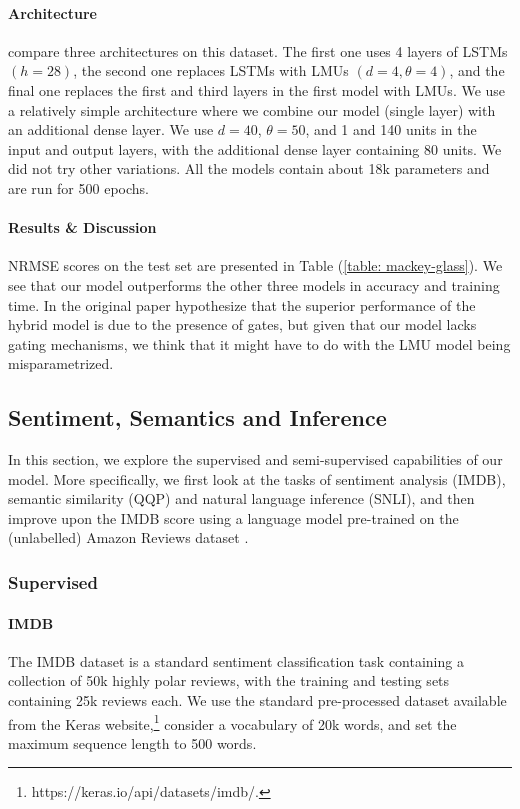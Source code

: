 \documentclass{article}
\begin{document}
\paragraph{Architecture} \citet{voelker2018improving} compare three architectures on this dataset. The first one uses 4 layers of LSTMs $(h=28)$, the second one replaces LSTMs with LMUs $(d=4, \theta=4)$, and the final one replaces the first and third layers in the first model with LMUs. We use a relatively simple architecture where we combine our model (single layer) with an additional dense layer. We use $d=40$, $\theta=50$, and 1 and 140 units in the input and output layers, with the additional dense layer containing 80 units. We did not try other variations. All the models contain about 18k parameters and are run for 500 epochs.

\paragraph{Results \& Discussion} NRMSE scores on the test set are presented in Table (\ref{table: mackey-glass}). We see that our model outperforms the other three models in accuracy and training time. In the original paper \citet{voelker2018improving} hypothesize that the superior performance of the hybrid model is due to the presence of gates, but given that our model lacks gating mechanisms, we think that it might have to do with the LMU model being misparametrized. 

\subsection{Sentiment, Semantics and Inference} 

In this section, we explore the supervised and semi-supervised capabilities of our model. More specifically, we first look at the tasks of sentiment analysis (IMDB), semantic similarity (QQP) and natural language inference (SNLI), and then improve upon the IMDB score using a language model pre-trained on the (unlabelled) Amazon Reviews dataset \cite{ni2019justifying}.

\subsubsection*{Supervised}

\paragraph{IMDB} The IMDB dataset \citep{maas2011learning} is a standard sentiment classification task containing a collection of 50k highly polar reviews, with the training and testing sets containing 25k reviews each. We use the standard pre-processed dataset available from the Keras website,\footnote{https://keras.io/api/datasets/imdb/.} consider a vocabulary of 20k words, and set the maximum sequence length to 500 words.
\end{document}
